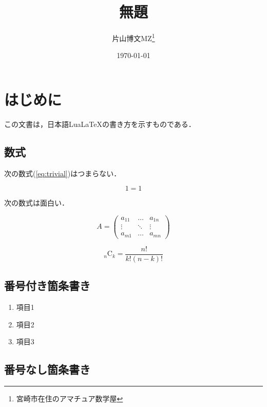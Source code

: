 \documentclass[a4paper,11pt,twocolumn]{ltjsarticle} %
\newcommand{\mathref}[1]{(\ref{#1})} %
\newcommand{\combination}[2]{{}_{#1} \mathrm{C}_{#2}} %
\begin{document}

\title{無題}
\author{片山博文MZ\footnote{宮崎市在住のアマチュア数学屋}}
\date{\today}
\maketitle


\section{はじめに}

この文書は，日本語LuaLaTeXの書き方を示すものである．

\subsection{数式}

次の数式\mathref{eq:trivial}はつまらない．

\begin{equation}
1 = 1 \label{eq:trivial}
\end{equation}

次の数式は面白い．

\begin{equation}
A = \begin{pmatrix}
	a_{11} & \ldots & a_{1n} \\
	\vdots & \ddots & \vdots \\
	a_{m1} & \ldots & a_{mn}
	\end{pmatrix}
\end{equation}

\begin{equation}
\combination{n}{k} = \frac{n!}{k! (n-k)!}
\end{equation}

\subsection{番号付き箇条書き}

\begin{enumerate}
\item 項目1
\item 項目2
\item 項目3
\end{enumerate}

\subsection{番号なし箇条書き}
\end{document}
